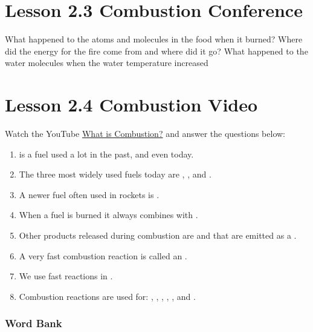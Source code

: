 \documentclass[answers,12pt]{exam}
\begin{document}
\section*{Lesson 2.3 Combustion Conference}

\begin{questions}
    \question What happened to the atoms and molecules in the food when it burned?
    \vspace{4cm}
    \question Where did the energy for the fire come from and where did it go? 
    \vspace{4cm}
    \question What happened to the water molecules when the water temperature increased
    \vspace{4cm}
\end{questions}

\newpage

\section*{Lesson 2.4 Combustion Video}

Watch the YouTube \href{https://www.youtube.com/watch?v=xd1alir07q4}{What is Combustion?} and answer the questions below:


\begin{enumerate}
    \item  \fillin[wood] is a fuel used a lot in the past, and even today.
    \item  The three most widely used fuels today are \fillin[coal], \fillin[oil], and .
    \item  A newer fuel often used in rockets is \fillin[hydrogen].
    \item  When a fuel is burned it always combines with \fillin[oxygen].
    \item  Other products released during combustion are  and \fillin[water] that are emitted as a \fillin[gas].
    \item  A very fast combustion reaction is called an \fillin[explosion].
    \item  We use fast reactions in .
    \item  Combustion reactions are used for:  \fillin[cooking], \fillin[manufacturing], , , , and \fillin[heating].
\end{enumerate}

\subsubsection*{Word Bank}
\end{document}
